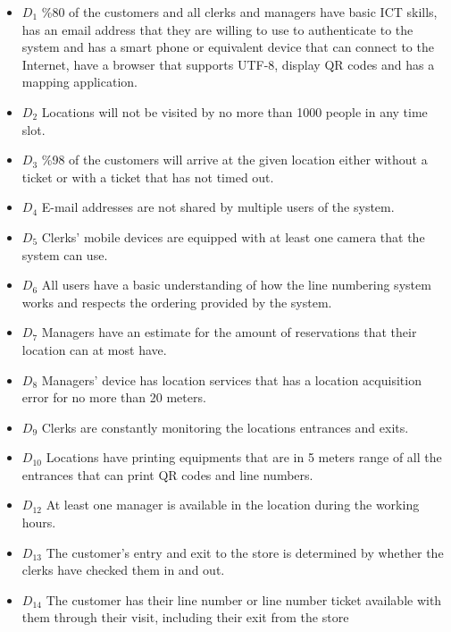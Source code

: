 \begin{itemize}
    \item \textbf{$D_1$} \%80 of the customers and all clerks and managers have basic ICT skills, has an email address that they are willing to use to authenticate to the system and has a smart phone or equivalent device that can connect to the Internet, have a browser that supports UTF-8, display QR codes and has a mapping application. %
    \item \textbf{$D_2$} Locations will not be visited by no more than 1000 people in any time slot. %
    \item \textbf{$D_3$} \%98 of the customers will arrive at the given location either without a ticket or with a ticket that has not timed out. %
    \item \textbf{$D_4$} E-mail addresses are not shared by multiple users of the system. %
    \item \textbf{$D_5$} Clerks' mobile devices are equipped with at least one camera that the system can use. %
    \item \textbf{$D_6$} All users have a basic understanding of how the line numbering system works and respects the ordering provided by the system. %
    \item \textbf{$D_7$} Managers have an estimate for the amount of reservations that their location can at most have. %
    \item \textbf{$D_8$} Managers' device has location services that has a location acquisition error for no more than 20 meters. %
    \item \textbf{$D_9$} Clerks are constantly monitoring the locations entrances and exits. %
    \item \textbf{$D_{10}$} Locations have printing equipments that are in 5 meters range of all the entrances that can print QR codes and line numbers. %
    \item \textbf{$D_{12}$} At least one manager is available in the location during the working hours. %
    \item \textbf{$D_{13}$} The customer's entry and exit to the store is determined by whether the clerks have checked them in and out.
    \item \textbf{$D_{14}$} The customer has their line number or line number ticket available with them through their visit, including their exit from the store %
\end{itemize}
